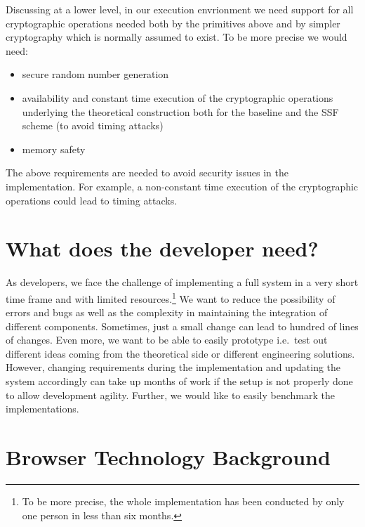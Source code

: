Discussing at a lower level, in our execution envrionment 
we need support for all cryptographic operations
needed both by the primitives above and by simpler
cryptography which is normally assumed to exist. 
To be more precise we would need:
\begin{itemize}
    \item secure random number generation
    \item availability and constant time execution of the cryptographic operations underlying the theoretical construction both for the baseline and the SSF scheme (to avoid timing attacks) 
    \item memory safety 
\end{itemize}
The above requirements are needed to avoid security
issues in the implementation. For example, a non-constant
time execution of the cryptographic operations could
lead to timing attacks.

\section{What does the developer need?}\label{sc:developer}

As developers, we face the challenge of implementing a full
system in a very short time frame and with limited resources.\footnote{To be more precise, the whole implementation has been conducted by only one person in less than six months.}
We want to reduce the possibility of errors and bugs
as well as the complexity in maintaining the integration of
different components.
Sometimes, just a small change can lead to
hundred of lines of changes.
Even more, we want to be able to easily prototype i.e.\ 
test out different ideas coming from the theoretical side
or different engineering solutions.
However, changing requirements during the implementation
and updating the system accordingly can take up months of work
if the setup is not properly done to allow development agility.
Further, we would like to easily benchmark the implementations.

\section{Browser Technology Background}\label{sc:tech-stack}

